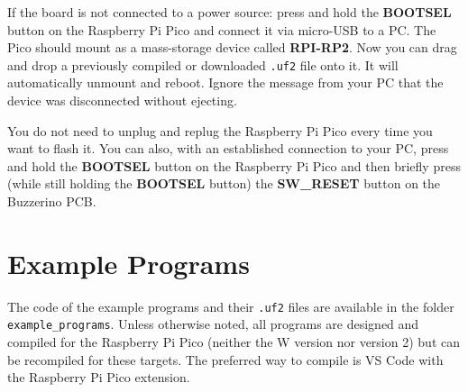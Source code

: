 \documentclass[a4paper,11pt]{article}
\begin{document}
If the board is not connected to a power source: press and hold the \textbf{BOOTSEL} button on the Raspberry Pi Pico and connect it via micro-USB to a PC. The Pico should mount as a mass-storage device called \textbf{RPI-RP2}. Now you can drag and drop a previously compiled or downloaded \texttt{.uf2} file onto it. It will automatically unmount and reboot. Ignore the message from your PC that the device was disconnected without ejecting.

You do not need to unplug and replug the Raspberry Pi Pico every time you want to flash it. You can also, with an established connection to your PC, press and hold the \textbf{BOOTSEL} button on the Raspberry Pi Pico and then briefly press (while still holding the \textbf{BOOTSEL} button) the \textbf{SW\_RESET} button on the Buzzerino PCB.

\section*{Example Programs}

The code of the example programs and their \texttt{.uf2} files are available in the folder \texttt{example\_programs}. Unless otherwise noted, all programs are designed and compiled for the Raspberry Pi Pico (neither the W version nor version 2) but can be recompiled for these targets. The preferred way to compile is VS Code with the Raspberry Pi Pico extension.
\end{document}
